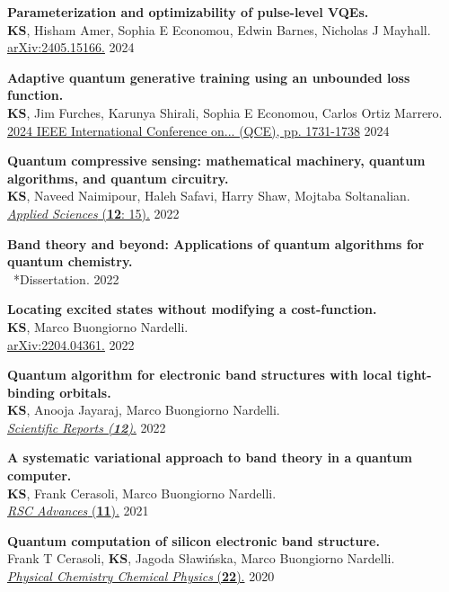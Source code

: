 \documentclass[marginmode, 10pt]{res} %
\newcommand{\me}{\textbf{KS}}       %
\begin{document}
\begin{resume}
\textbf{Parameterization and optimizability of pulse-level VQEs.} \\
    \me, Hisham Amer, Sophia E Economou, Edwin Barnes, Nicholas J Mayhall. \\
    \href{https://arxiv.org/abs/2405.15166}{arXiv:2405.15166.} \hfill 2024

\textbf{Adaptive quantum generative training using an unbounded loss function.} \\
    \me, Jim Furches, Karunya Shirali, Sophia E Economou, Carlos Ortiz Marrero. \\
    \href{https://arxiv.org/abs/2408.00218}{2024 IEEE International Conference on... (QCE), pp. 1731-1738} \hfill 2024

\textbf{Quantum compressive sensing: mathematical machinery, quantum algorithms, and quantum circuitry.} \\
    \me, Naveed Naimipour, Haleh Safavi, Harry Shaw, Mojtaba Soltanalian. \\
    \href{https://doi.org/10.3390/app12157525}{\textit{Applied Sciences} (\textbf{12}: 15).} \hfill 2022

\textbf{Band theory and beyond: Applications of quantum algorithms for quantum chemistry.} \\
    ~*Dissertation. \hfill 2022

\textbf{Locating excited states without modifying a cost-function.} \\
    \me, Marco Buongiorno Nardelli. \\
    \href{https://arxiv.org/abs/2204.04361}{arXiv:2204.04361.} \hfill 2022

\textbf{Quantum algorithm for electronic band structures with local tight-binding orbitals.} \\
    \me, Anooja Jayaraj, Marco Buongiorno Nardelli. \\
    \href{https://doi.org/10.1038/s41598-022-13627-x}{\textit{Scientific Reports (\textbf{12})}.} \hfill 2022

\textbf{A systematic variational approach to band theory in a quantum computer.} \\
    \me, Frank Cerasoli, Marco Buongiorno Nardelli. \\
    \href{https://doi.org/10.1039/D1RA07451B}{\textit{RSC Advances} (\textbf{11}).} \hfill 2021

\textbf{Quantum computation of silicon electronic band structure.} \\
    Frank T Cerasoli, \me, Jagoda S\l{}awi\'nska, Marco Buongiorno Nardelli. \\
    \href{https://arxiv.org/abs/2006.03807}{\textit{Physical Chemistry Chemical Physics} (\textbf{22}).} \hfill 2020


\end{resume}
\end{document}
